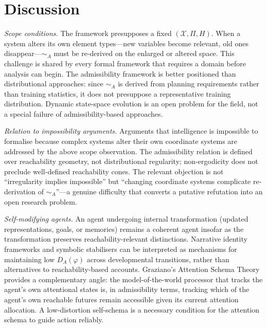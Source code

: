 \documentclass[10pt,twocolumn]{article}
\theoremstyle{plain}
\theoremstyle{definition}
\theoremstyle{remark}
\newcommand{\simA}{\sim_{\!A}}
\newcommand{\DA}{D_{A}(\varphi)}
\newcommand{\calX}{\mathcal{X}}
\begin{document}
\section{Discussion}
\label{sec:discussion}

\textit{Scope conditions.} The framework presupposes a fixed $(\calX,\Pi,H)$.
When a system alters its own element types---new variables become relevant, old
ones disappear---$\simA$ must be re-derived on the enlarged or altered space.
This challenge is shared by every formal framework that requires a domain before
analysis can begin. The admissibility framework is better positioned than
distributional approaches: since $\simA$ is derived from planning requirements
rather than training statistics, it does not presuppose a representative training
distribution. Dynamic state-space evolution is an open problem for the field, not
a special failure of admissibility-based approaches.

\textit{Relation to impossibility arguments.} Arguments that intelligence is
impossible to formalise because complex systems alter their own coordinate systems
are addressed by the above scope observation. The admissibility relation is defined
over reachability geometry, not distributional regularity; non-ergodicity does not
preclude well-defined reachability cones. The relevant objection is not
``irregularity implies impossible'' but ``changing coordinate systems complicate
re-derivation of $\simA$''---a genuine difficulty that converts a putative
refutation into an open research problem.

\textit{Self-modifying agents.} An agent undergoing internal transformation
(updated representations, goals, or memories) remains a coherent agent insofar as
the transformation preserves reachability-relevant distinctions. Narrative identity
frameworks and symbolic stabilisers can be interpreted as mechanisms for
maintaining low $\DA$ across developmental transitions, rather than alternatives
to reachability-based accounts. Graziano's Attention Schema Theory
\citep{graziano2013consciousness} provides a complementary angle: the model-of-the-world
processor that tracks the agent's own attentional states is, in admissibility
terms, tracking which of the agent's own reachable futures remain accessible
given its current attention allocation. A low-distortion self-schema is a
necessary condition for the attention schema to guide action reliably.
\end{document}
